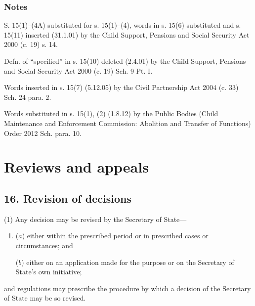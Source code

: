 \documentclass[a4paper]{article}
\newcommand\amendment[1]{\subsubsection*{Notes}{\itshape\frenchspacing\footnotesize #1 \par}}
\begin{document}
\amendment{

S. 15(1)--(4A) substituted for s. 15(1)--(4), words in s. 15(6) substituted and s. 15(11) inserted (31.1.01) by the Child Support,
Pensions and Social Security Act 2000 (c. 19) s. 14.

Defn. of “specified” in s. 15(10) deleted (2.4.01) by the Child Support, Pensions and Social
Security Act 2000 (c. 19) Sch. 9 Pt. I.

Words inserted in s. 15(7) (5.12.05) by the Civil Partnership Act 2004 (c. 33) Sch. 24 para. 2.

Words substituted in s. 15(1), (2) (1.8.12) by the Public Bodies (Child Maintenance and
Enforcement Commission: Abolition and Transfer of Functions) Order 2012 Sch. para. 10.
	

}

\section{Reviews and appeals}

\subsection{16. Revision of decisions}

(1) Any decision may be revised by the Secretary of State---
\begin{enumerate}\item[]
($a$)
either within the prescribed period or in prescribed cases or circumstances; and

($b$)
either on an application made for the purpose or on the Secretary of State’s own initiative;
\end{enumerate}
and regulations may prescribe the procedure by which a decision of the Secretary of State may be so revised.

\end{document}

